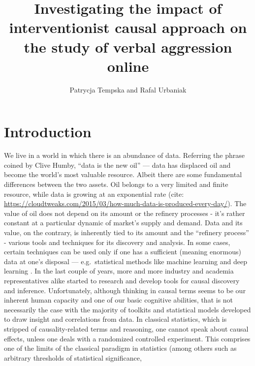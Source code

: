 \documentclass[
  10pt,
  dvipsnames,enabledeprecatedfontcommands]{scrartcl}
\title{Investigating the impact of interventionist causal approach on
the study of verbal aggression online}
\author{Patrycja Tempska and Rafal Urbaniak}
\date{}
\begin{document}
\maketitle

\tableofcontents

\vspace{1mm}
\footnotesize

\normalsize

\hypertarget{introduction}{%
\section{Introduction}\label{introduction}}

We live in a world in which there is an abundance of data. Referring the
phrase coined by Clive Humby, ``data is the new oil'' --- data has
displaced oil and become the world's most valuable resource. Albeit
there are some fundamental differences between the two assets. Oil
belongs to a very limited and finite resource, while data is growing at
an exponential rate (cite:
\url{https://cloudtweaks.com/2015/03/how-much-data-is-produced-every-day/}).
The value of oil does not depend on its amount or the refinery processes
- it's rather constant at a particular dynamic of market's supply and
demand. Data and its value, on the contrary, is inherently tied to its
amount and the ``refinery process'' - various tools and techniques for
its discovery and analysis. In some cases, certain techniques can be
used only if one has a sufficient (meaning enormous) data at one's
disposal --- e.g.~statistical methods like machine learning and deep
learning . In the last couple of years, more and more industry and academia
representatives alike started to research and develop tools for causal
discovery and inference. Unfortunately, although thinking in causal
terms seems to be our inherent human capacity and one of our basic
cognitive abilities, that is not necessarily the case with the majority
of toolkits and statistical models developed to draw insight and
correlations from data. In classical statistics, which is stripped of
causality-related terms and reasoning, one cannot speak about causal
effects, unless one deals with a randomized controlled experiment. This
comprises one of the limits of the classical paradigm in statistics
(among others such as arbitrary thresholds of statistical significance,
\end{document}
